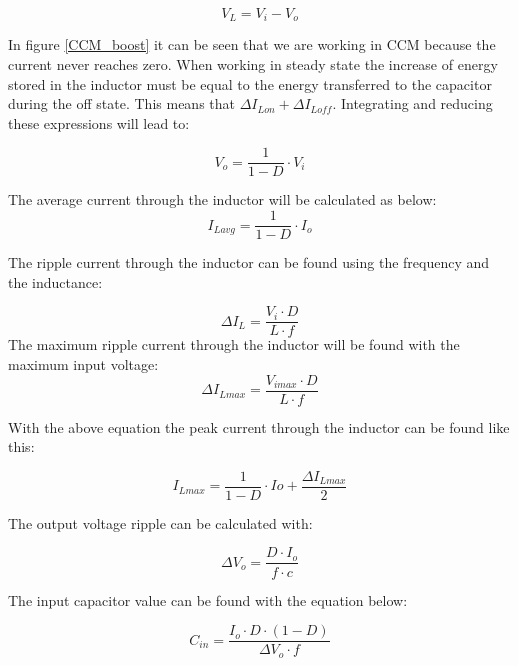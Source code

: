 \begin{equation}
V_L = V_i-V_o
\end{equation}

In figure \ref{CCM_boost} it can be seen that we are working in CCM because the current never reaches zero. 
When working in steady state the increase of energy stored in the inductor must be equal to the energy transferred to the capacitor during the off state. This means that $\Delta I_{Lon}+\Delta I_{Loff}$. Integrating and reducing these expressions will lead to:

\begin{equation}
V_o = \frac{1}{1-D}\cdot V_i
\end{equation}
 
The average current through the inductor will be calculated as below:
\begin{equation}
I_{Lavg} = \frac{1}{1-D}\cdot I_o
\end{equation}

The ripple current through the inductor can be found using the frequency and the inductance:

\begin{equation}\label{boostind}
\Delta I_L = \frac{V_i\cdot D}{L\cdot f}
\end{equation}
The maximum ripple current through the inductor will be found with the maximum input voltage:
\begin{equation}
\Delta I_{Lmax} = \frac{V_{imax}\cdot D}{L\cdot f}
\end{equation}

With the above equation the peak current through the inductor can be found like this:

\begin{equation}
I_{Lmax} = \frac{1}{1-D}\cdot Io+\frac{\Delta I_{Lmax}}{2}
\end{equation}

The output voltage ripple can be calculated with:

\begin{equation}\label{boostc}
\Delta V_o = \frac{D\cdot I_o}{f\cdot c}
\end{equation} \cite{boost_equation}

The input capacitor value can be found with the equation below:

\begin{equation}
\label{boostcin}
C_{in} = \frac{I_o\cdot D\cdot (1-D)}{\Delta V_o\cdot f}
\end{equation} \cite{underthehood} 
